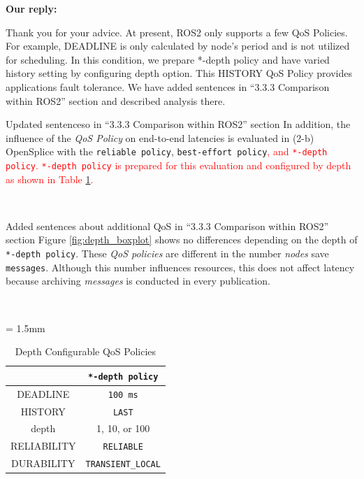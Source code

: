 \documentclass{article}
\begin{document}
\begin{enumerate}
  \begin{flushleft}
    \textbf{Our reply:}
  \end{flushleft}
  Thank you for your advice.
  At present, ROS2 only supports a few QoS Policies.
  For example, DEADLINE is only calculated by node's period and is not utilized for scheduling.
  In this condition, we prepare *-depth policy and have varied history setting by configuring depth option.
  This HISTORY QoS Policy provides applications fault tolerance.
  We have added sentences in ``3.3.3 Comparison within ROS2'' section and described analysis there.
  \begin{itembox}[|]{Updated sentenceso in ``3.3.3 Comparison within ROS2'' section}
    In addition, the influence of the \emph{QoS Policy} on end-to-end latencies is evaluated in (2-b) OpenSplice with the \texttt{reliable policy}, \texttt{best-effort policy}\textcolor{red}{, and \texttt{*-depth policy}.
      \texttt{*-depth policy} is prepared for this evaluation and configured by depth as shown in Table \ref{tb:depth_qos}.}
  \end{itembox}\\
  \begin{itembox}[|]{Added sentences about additional QoS in ``3.3.3 Comparison within ROS2'' section}
    Figure \ref{fig:depth_boxplot} shows no differences depending on the depth of \texttt{*-depth policy}.
    These \emph{QoS policies} are different in the number \emph{nodes} save \texttt{messages}.
    Although this number influences resources, this does not affect latency because archiving \emph{messages} is conducted in every publication.
  \end{itembox}\\
  \renewcommand{\arraystretch}{1.0}
  \setcounter{table}{4}
  \begin{table}[H]
    \caption{\label{tb:depth_qos}Depth Configurable QoS Policies}
    \centering
    \tabcolsep = 1.5mm              %
    \begin{tabular}{c|c}
      \hline
      & \textbf{\texttt{*-depth policy} }\\
      \hline
      \hline
      DEADLINE & \texttt{100 ms}\\
      HISTORY & \texttt{LAST}\\
      depth & 1, 10, or 100\\
      RELIABILITY & \texttt{RELIABLE}\\
      DURABILITY & \texttt{TRANSIENT\_LOCAL}\\
      \hline
    \end{tabular}

\end{table}
\end{enumerate}
\end{document}
